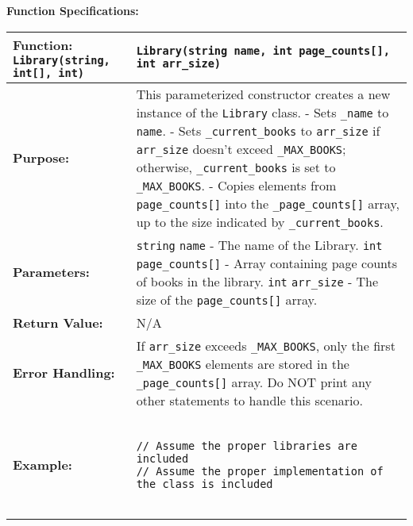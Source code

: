 \textbf{Function Specifications:}

\renewcommand{\arraystretch}{1.5}
\begin{longtable}{|p{1.7in}|p{4.3in}|}
\hline
\textbf{Function:} \texttt{Library(string, int[], int)} & \texttt{Library(string name, int page_counts[], int arr_size)} \\ \hline

\textbf{Purpose:} & This parameterized constructor creates a new instance of the \texttt{Library} class. \newline
- Sets \texttt{_name} to \texttt{name}. \newline
- Sets \texttt{_current_books} to \texttt{arr_size} if \texttt{arr_size} doesn't exceed \texttt{_MAX_BOOKS}; otherwise, \texttt{_current_books} is set to \texttt{_MAX_BOOKS}. \newline
- Copies elements from \texttt{page_counts[]} into the \texttt{_page_counts[]} array, up to the size indicated by \texttt{_current_books}. \\ \hline

\textbf{Parameters:} & 
\texttt{string} \texttt{name} - The name of the Library. \newline
\texttt{int} \texttt{page_counts[]} - Array containing page counts of books in the library. \newline
\texttt{int} \texttt{arr_size} - The size of the \texttt{page_counts[]} array. \\ \hline

\textbf{Return Value:} & N/A \\ \hline

\textbf{Error Handling:} & 
If \texttt{arr_size} exceeds \texttt{_MAX_BOOKS}, only the first \texttt{_MAX_BOOKS} elements are stored in the \texttt{_page_counts[]} array. Do NOT print any other statements to handle this scenario. \\ \hline

\textbf{Example:} & 


\begin{example}


\begin{verbatim}

// Assume the proper libraries are included
// Assume the proper implementation of the class is included


\end{verbatim}
\end{example}
\end{longtable}
